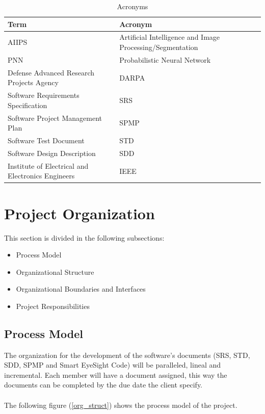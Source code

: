 \documentclass[12pt]{article}
\begin{document}
\begin{table}[H]\centering
\begin{tabular}{|>{\centering\arraybackslash}m{7cm}|>{\centering\arraybackslash}m{7cm}|}
  \hline
  Term & Acronym \\
   \hline
   AIIPS & Artificial Intelligence and Image Processing/Segmentation   \\
    \hline
    PNN & Probabilistic Neural Network \\
    \hline
  Defense Advanced Research Projects Agency  & DARPA \\
   \hline
  Software Requirements Specification & SRS \\
   \hline
    Software Project Management Plan & SPMP \\
   \hline
     Software Test Document & STD \\
   \hline
     Software Design Description & SDD \\
     \hline
     Institute of Electrical and Electronics Engineers & IEEE\\
   \hline
\end{tabular}
\caption{Acronyms}
\end{table}

\section{Project Organization}
This section is divided in the following subsections:
\begin{itemize}
  \item Process Model
  \item Organizational Structure
  \item Organizational Boundaries and Interfaces
  \item Project Responsibilities
\end{itemize}

\subsection{Process Model}
The organization for the development of the software's documents (SRS, STD, SDD, SPMP and Smart EyeSight Code) will be paralleled, lineal and incremental. Each member will have a document assigned, this way the documents can be completed by the due date the client specify.\\\\
The following figure (\ref{org_struct}) shows the process model of the project.
\end{document}
